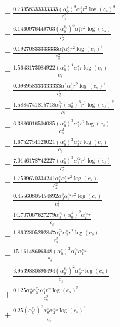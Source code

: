 \documentclass[10pt]{article}
\begin{document}
\begin{align*}
&{}  - \frac{0.73958333333333 \left(\alpha_{0}^s\right)^{3} \alpha_{1}^s r^{2} \log{\left(c_{s} \right)}^{3}}{c_{s}^{2}} \\
&{}  - \frac{6.1460976449703 \left(\alpha_{0}^{c_s}\right)^{3} \alpha_{1}^s r^{2} \log{\left(c_{s} \right)}}{c_{s}^{2}} \\
&{}  - \frac{0.19270833333333 \alpha_{1}^s \alpha_{2}^s r^{2} \log{\left(c_{s} \right)}^{3}}{c_{s}^{2}} \\
&{}  - \frac{1.5643173084922 \left(\alpha_{0}^s\right)^{4} \alpha_{1}^s r \log{\left(c_{s} \right)}}{c_{s}} \\
&{}  - \frac{0.098958333333333 \alpha_{0}^s \alpha_{3}^s r^{2} \log{\left(c_{s} \right)}^{3}}{c_{s}^{2}} \\
&{}  - \frac{1.5884741815718 \alpha_{0}^{c_s} \left(\alpha_{0}^s\right)^{3} r^{3} \log{\left(c_{s} \right)}^{2}}{c_{s}^{3}} \\
&{}  - \frac{6.3886016504085 \left(\alpha_{0}^s\right)^{3} \alpha_{1}^s r^{2} \log{\left(c_{s} \right)}}{c_{s}^{2}} \\
&{}  - \frac{1.6752754126021 \left(\alpha_{0}^s\right)^{2} \alpha_{3}^s r \log{\left(c_{s} \right)}}{c_{s}} \\
&{}  - \frac{7.0146178742227 \left(\alpha_{0}^s\right)^{3} \alpha_{1}^{c_s} r^{2} \log{\left(c_{s} \right)}}{c_{s}^{2}} \\
&{}  - \frac{1.7599670334241 \alpha_{1}^s \alpha_{2}^s r^{2} \log{\left(c_{s} \right)}}{c_{s}^{2}} \\
&{}  - \frac{0.45560805454892 \alpha_{0}^s \alpha_{3}^{c_s} r^{2} \log{\left(c_{s} \right)}}{c_{s}^{2}} \\
&{}  - \frac{14.707067627279 \alpha_{0}^{c_s} \left(\alpha_{0}^s\right)^{2} \alpha_{2}^{c_s} r}{c_{s}} \\
&{}  - \frac{1.8602805292847 \alpha_{1}^{c_s} \alpha_{2}^s r^{2} \log{\left(c_{s} \right)}}{c_{s}^{2}} \\
&{}  - \frac{15.16148696948 \left(\alpha_{0}^s\right)^{2} \alpha_{1}^{c_s} \alpha_{1}^s r}{c_{s}} \\
&{}  - \frac{3.9539880896494 \left(\alpha_{0}^{c_s}\right)^{2} \alpha_{3}^s r \log{\left(c_{s} \right)}}{c_{s}} \\
&{}  + \frac{0.125 \alpha_{0}^s \alpha_{1}^{c_s} \alpha_{1}^s r^{2} \log{\left(c_{s} \right)}^{3}}{c_{s}^{2}} \\
&{}  + \frac{0.25 \left(\alpha_{0}^{c_s}\right)^{2} \alpha_{0}^s \alpha_{2}^s r \log{\left(c_{s} \right)}^{3}}{c_{s}} \\

\end{align*}
\end{document}
